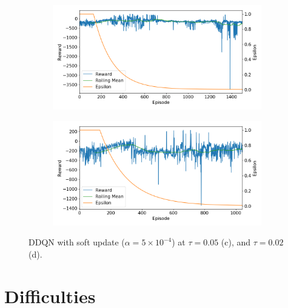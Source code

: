\documentclass[10pt]{article}
\begin{document}
  
\begin{figure}[H]
  \centering
   \begin{subfigure}[b]{0.49\linewidth}
  \centering
  \includegraphics[width=\linewidth]{../logs/train_param_0077.png}
      \caption{}
  \label{fig:train_param_0077}
  \end{subfigure}
  \begin{subfigure}[b]{0.49\linewidth}
  \centering
  \includegraphics[width=\linewidth]{../logs/train_param_0079.png}
      \caption{}
  \label{fig:train_param_0079}
  \end{subfigure}
  \caption{DDQN with soft update ($\alpha=5\times 10^{-4}$) at $\tau=0.05$ (c), and $\tau=0.02$ (d).}
  \label{fig:nnbestparam}
\end{figure}





\section{Difficulties} \label{difficulties}
\end{document}
